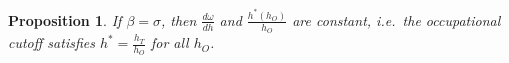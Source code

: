 \documentclass[onehalfspacing,11pt]{article}
\newtheorem{prp}{Proposition}
\begin{document}
%
%
\begin{prp}
If $\beta = \sigma$, then $\frac{d\omega}{dh}$ and $\frac{h^*(h_O)}{h_O}$ are constant, i.e.~the occupational cutoff satisfies $h^* = \frac{h_T}{h_O}$ for all $h_O$.
\end{prp}
\end{document}
